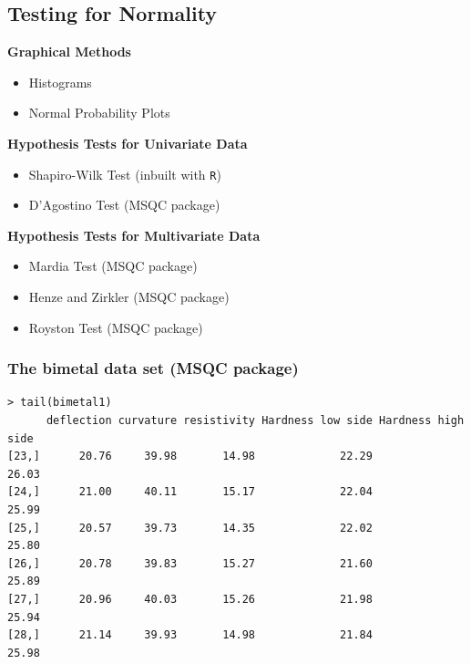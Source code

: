 \documentclass[]{article}
\begin{document}
\newpage


\newpage
\subsection{Testing for Normality}
{
\large
\textbf{Graphical Methods}
\begin{itemize}
\item Histograms
\item Normal Probability Plots
\end{itemize}

\noindent\textbf{Hypothesis Tests for Univariate Data}
\begin{itemize}
\item Shapiro-Wilk Test (inbuilt with \texttt{R})
\item D'Agostino Test (MSQC package)
\end{itemize}
\bigskip

\noindent\textbf{Hypothesis Tests for Multivariate Data}
\begin{itemize}
\item Mardia Test (MSQC package)
\item Henze and Zirkler (MSQC package)
\item Royston Test (MSQC package)
\end{itemize}


}
\newpage
\subsubsection{The bimetal data set (MSQC package)}
\begin{framed}
\begin{verbatim}
> tail(bimetal1)
      deflection curvature resistivity Hardness low side Hardness high side
[23,]      20.76     39.98       14.98             22.29              26.03
[24,]      21.00     40.11       15.17             22.04              25.99
[25,]      20.57     39.73       14.35             22.02              25.80
[26,]      20.78     39.83       15.27             21.60              25.89
[27,]      20.96     40.03       15.26             21.98              25.94
[28,]      21.14     39.93       14.98             21.84              25.98

\end{verbatim}
\end{framed}
\end{document}
